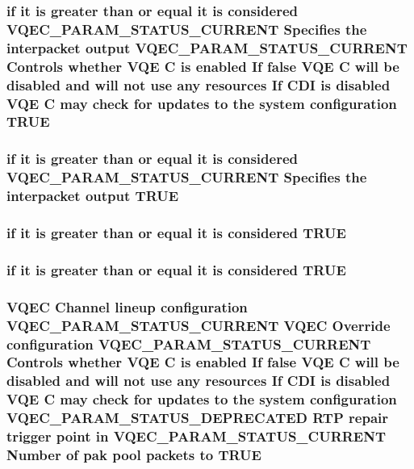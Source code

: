 \subsubsection{\setlength{\rightskip}{0pt plus 5cm}if it is greater than or equal it is considered VQEC\_\-PARAM\_\-STATUS\_\-CURRENT Specifies the interpacket output VQEC\_\-PARAM\_\-STATUS\_\-CURRENT Controls whether VQE \bf{C} is enabled If false VQE \bf{C} will be disabled and will not use any resources If CDI is disabled VQE \bf{C} may check for updates \bf{to} the system configuration \bf{TRUE}}\label{vqec__cfg__settings_8h_97dadabd18c24611b92b65b3e6d70dd6}


\subsubsection{\setlength{\rightskip}{0pt plus 5cm}if it is greater than or equal it is considered VQEC\_\-PARAM\_\-STATUS\_\-CURRENT Specifies the interpacket output \bf{TRUE}}\label{vqec__cfg__settings_8h_f6e2fbe2cdebc7e0661a36ab3e446586}


\subsubsection{\setlength{\rightskip}{0pt plus 5cm}if it is greater than or equal it is considered \bf{TRUE}}\label{vqec__cfg__settings_8h_0e99cc0a2843468096049595d939954f}


\subsubsection{\setlength{\rightskip}{0pt plus 5cm}if it is greater than or equal it is considered \bf{TRUE}}\label{vqec__cfg__settings_8h_0e99cc0a2843468096049595d939954f}


\subsubsection{\setlength{\rightskip}{0pt plus 5cm}VQEC Channel lineup configuration VQEC\_\-PARAM\_\-STATUS\_\-CURRENT VQEC Override configuration VQEC\_\-PARAM\_\-STATUS\_\-CURRENT Controls whether VQE \bf{C} is enabled If false VQE \bf{C} will be disabled and will not use any resources If CDI is disabled VQE \bf{C} may check for updates \bf{to} the system configuration VQEC\_\-PARAM\_\-STATUS\_\-DEPRECATED RTP repair trigger point in VQEC\_\-PARAM\_\-STATUS\_\-CURRENT Number of pak pool packets \bf{to} \bf{TRUE}}\label{vqec__cfg__settings_8h_8b978c6996db14d80a2ce862c2dfeeb9}


